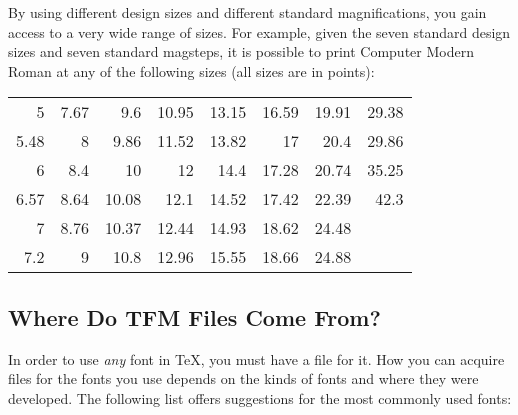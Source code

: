 By using different design sizes and different standard magnifications,
you gain access to a very wide range of sizes.  For example, given
the seven standard design sizes and seven standard magsteps, it is
possible to print Computer Modern Roman at any of the following sizes
(all sizes are in points):

{\def\b{\phantom{0}}\def\d{\phantom{.}}%
\begin{tabular}{rrrrrrrr}
5\d\b\b & 7.67    &  9.6\b   & 10.95    & 13.15  & 16.59 & 19.91 & 29.38\\
5.48    & 8\d\b\b &  9.86    & 11.52    & 13.82  & 17\d\b\b & 20.4\b  & 29.86\\
6\d\b\b & 8.4\b   & 10\d\b\b & 12\d\b\b & 14.4\b & 17.28 & 20.74 & 35.25\\
6.57    & 8.64    & 10.08    & 12.1\b   & 14.52  & 17.42 & 22.39 & 42.3\b \\
7\d\b\b & 8.76    & 10.37    & 12.44    & 14.93  & 18.62 & 24.48 & \\   
7.2\b   & 9\d\b\b & 10.8\b   & 12.96    & 15.55  & 18.66 & 24.88 & \\   
\end{tabular}%
}

\subsection{Where Do TFM Files Come From?}
\label{sec:gettingtfms}

In order to use {\em any\/} font in \TeX, you must have a  file
for it.  How you can 
acquire  files for the fonts you use depends
on the kinds of fonts and where they were developed.  The following
list offers suggestions for the most commonly used fonts:

